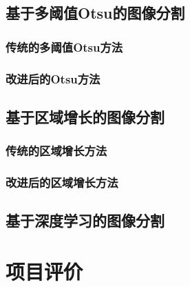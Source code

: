 \documentclass[UTF8]{ctexart}
\begin{document}
\subsection{基于多阈值Otsu的图像分割}
\subsubsection{传统的多阈值Otsu方法}
\subsubsection{改进后的Otsu方法}


\subsection{基于区域增长的图像分割}
\subsubsection{传统的区域增长方法}
\subsubsection{改进后的区域增长方法}

\subsection{基于深度学习的图像分割}


\section{项目评价}
\end{document}

